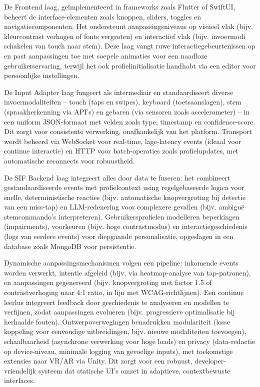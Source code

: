 \documentclass[openany]{book}
\begin{document}
De Frontend laag, geïmplementeerd in frameworks zoals Flutter of SwiftUI, beheert de interface-elementen zoals knoppen, sliders, toggles en navigatiecomponenten. Het ondersteunt aanpassingsniveaus op visueel vlak (bijv. kleurcontrast verhogen of fonts vergroten) en interactief vlak (bijv. invoermodi schakelen van touch naar stem). Deze laag vangt ruwe interactiegebeurtenissen op en past aanpassingen toe met soepele animaties voor een naadloze gebruikerservaring, terwijl het ook profielinitialisatie handhabt via een editor voor persoonlijke instellingen.

De Input Adapter laag fungeert als intermediair en standaardiseert diverse invoermodaliteiten – touch (taps en swipes), keyboard (toetsaanslagen), stem (spraakherkenning via API's) en gebaren (via sensoren zoals accelerometer) – in een uniform JSON-formaat met velden zoals type, timestamp en confidence-score. Dit zorgt voor consistente verwerking, onafhankelijk van het platform. Transport wordt beheerd via WebSocket voor real-time, lage-latency events (ideaal voor continue interactie) en HTTP voor batch-operaties zoals profielupdates, met automatische reconnects voor robuustheid.

De SIF Backend laag integreert alles door data te fuseren: het combineert gestandaardiseerde events met profielcontext using regelgebaseerde logica voor snelle, deterministische reacties (bijv. automatische knopvergroting bij detectie van een miss-tap) en LLM-redenering voor complexere gevallen (bijv. ambiguë stemcommando's interpreteren). Gebruikersprofielen modelleren beperkingen (impairments), voorkeuren (bijv. hoge contrastmodus) en interactiegeschiedenis (logs van eerdere events) voor diepgaande personalisatie, opgeslagen in een database zoals MongoDB voor persistentie.

Dynamische aanpassingsmechanismen volgen een pipeline: inkomende events worden verwerkt, intentie afgeleid (bijv. via heatmap-analyse van tap-patronen), en aanpassingen gegenereerd (bijv. knopvergroting met factor 1.5 of contrastverhoging naar 4:1 ratio, in lijn met WCAG-richtlijnen). Een continue leerlus integreert feedback door geschiedenis te analyseren en modellen te verfijnen, zodat aanpassingen evolueren (bijv. progressieve optimalisatie bij herhaalde fouten). Ontwerpoverwegingen benadrukken modulariteit (losse koppeling voor eenvoudige uitbreidingen, bijv. nieuwe modaliteiten toevoegen), schaalbaarheid (asynchrone verwerking voor hoge loads) en privacy (data-redactie op device-niveau, minimale logging van gevoelige inputs), met toekomstige extensies naar VR/AR via Unity. Dit zorgt voor een robuust, developer-vriendelijk systeem dat statische UI's omzet in adaptieve, contextbewuste interfaces.
\end{document}
